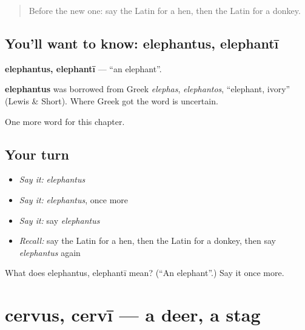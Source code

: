 \label{lesson:LA-C92-elephantus}



\begin{quote}
Before the new one: say the Latin for a hen, then the Latin for a donkey.
\end{quote}

\subsection*{You'll want to know: elephantus, elephantī}
\textbf{elephantus, elephantī} — \textquotedblleft{}an elephant\textquotedblright{}.

\begin{cousinweb}
\textbf{elephantus} was borrowed from Greek \emph{elephas}, \emph{elephantos}, \textquotedblleft{}elephant, ivory\textquotedblright{} (Lewis \& Short). Where Greek got the word is uncertain.
\end{cousinweb}

\begin{grammarlens}[title={What you've built}]
One more word for this chapter.
\end{grammarlens}

\subsection*{Your turn}
\begin{itemize}
\raggedright
  \item \emph{Say it:} \emph{elephantus}
  \item \emph{Say it:} \emph{elephantus}, once more
  \item \emph{Say it:} say \emph{elephantus}
  \item \emph{Recall:} say the Latin for a hen, then the Latin for a donkey, then say \emph{elephantus} again
\end{itemize}

\begin{tcolorbox}[breakable,colback=teal!4,colframe=teal!35!black,title={Before you move on}]
What does elephantus, elephantī mean? (\textquotedblleft{}An elephant\textquotedblright{}.) Say it once more.
\end{tcolorbox}
\section[cervus, cervī]{cervus, cervī — a deer, a stag}

\label{lesson:LA-C92-cervus}



